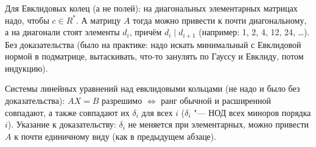 Для Евклидовых колец (а не полей): на диагональных элементарных матрицах надо, чтобы $c \in R^*$.
А матрицу $A$ тогда можно привести к почти диагональному, а на диагонали стоят элементы $d_i$, причём $d_i \mid d_{i+1}$ (например: 1, 2, 4, 12, 24, \dots).
Без доказательства (было на практике: надо искать минимальный с Евклидовой нормой в подматрице, вытаскивать, что-то занулять по Гауссу и Евклиду, потом индукцию).

Системы линейных уравнений над евклидовыми кольцами (не надо и было без доказательства):
$AX=B$ разрешимо $\iff$ ранг обычной и расширенной совпадают, а также совпадают их $\delta_i$ для всех $i$ ($\delta_i$ "--- НОД всех миноров порядка $i$).
Указание к доказательству: $\delta_i$ не меняется при элементарных, можно привести $A$ к почти единичному виду (как в предыдущем абзаце).

